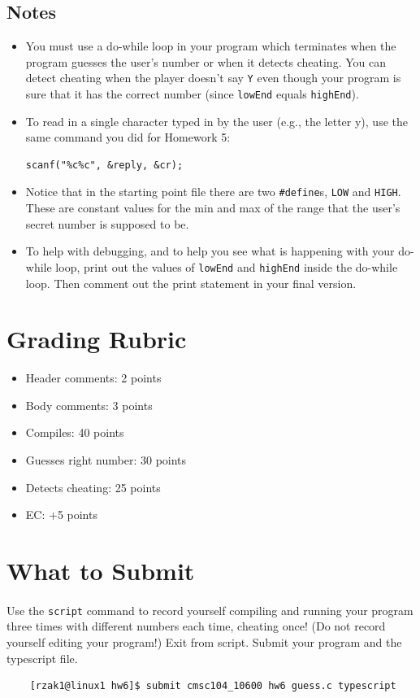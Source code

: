 \documentclass[letter,11pt]{article}
\begin{document}
\subsection*{Notes}
\begin{itemize}
    \item You must use a do-while loop in your program which terminates when the program guesses the user's number or when it detects cheating. You can detect cheating when the player doesn’t say \texttt{Y} even though your program is sure that it has the correct number (since \texttt{lowEnd} equals \texttt{highEnd}).
    \item To read in a single character typed in by the user (e.g., the letter y), use the same command you did for Homework 5:
    \begin{verbatim}
scanf("%c%c", &reply, &cr);
\end{verbatim}
    \item Notice that in the starting point file there are two \verb|#define|s, \texttt{LOW} and \texttt{HIGH}. These are constant values for the min and max of the range that the user’s secret number is supposed to be.
    \item To help with debugging, and to help you see what is happening with your do-while loop, print out the values of \texttt{lowEnd} and \texttt{highEnd} inside the do-while loop. Then comment out the print statement in your final version. 
\end{itemize}

\section*{Grading Rubric}
\begin{itemize}
    \item Header comments: 2 points
    \item Body comments: 3 points
    \item Compiles: 40 points
    \item Guesses right number: 30 points
    \item Detects cheating: 25 points
    \item EC: +5 points
\end{itemize}

\section*{What to Submit}
\paragraph{}Use the \texttt{script} command to record yourself compiling and running your program three times with different numbers each time, cheating once! (Do not record yourself editing your program!) Exit from script. Submit your program and the typescript file.
\begin{verbatim}
    [rzak1@linux1 hw6]$ submit cmsc104_10600 hw6 guess.c typescript
\end{verbatim}
\end{document}
